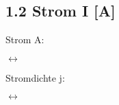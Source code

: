 \subsection*{1.2 Strom I [A]}
Strom A:

\vspace{-1mm}\begin{minipage}{0.4\linewidth}
    \begin{footnotesize}
        \begin{center}
            
        \end{center}
    \end{footnotesize}
\end{minipage}
$\longleftrightarrow$
\begin{minipage}{0.4\linewidth}
    \begin{footnotesize}
        \begin{center}
        \end{center}
    \end{footnotesize}
\end{minipage}
\vspace{1mm}

Stromdichte j:

\vspace{-1mm}\begin{minipage}{0.25\linewidth}
    \begin{footnotesize}
        \begin{center}
            
        \end{center}
    \end{footnotesize}
\end{minipage}
$\longleftrightarrow$
\begin{minipage}{0.55\linewidth}
    \begin{footnotesize}
        \begin{center}
        \end{center}
    \end{footnotesize}
\end{minipage}
\vspace{1mm}

